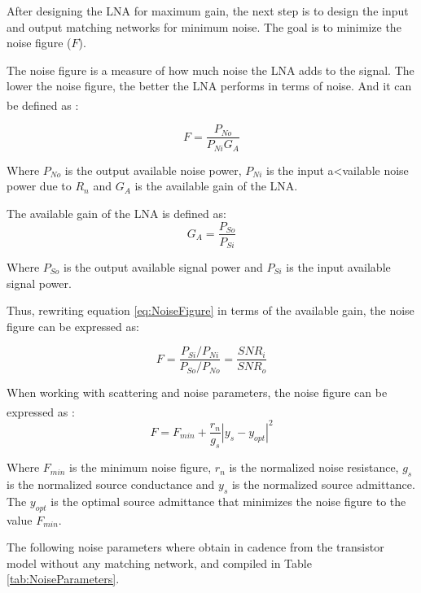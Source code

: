 After designing the LNA for maximum gain, the next step is to design the input and output matching networks for minimum noise. The goal is to minimize the noise figure ($F$). 

The noise figure is a measure of how much noise the LNA adds to the signal. The lower the noise figure, the better the LNA performs in terms of noise. And it can be defined as \textsuperscript{\cite{Gillermo-Gonzalez}}:

\begin{equation}
    F = \frac{P_{No}}{P_{Ni}G_A}
    \label{eq:NoiseFigure}
\end{equation}

Where $P_{No}$ is the output available noise power, $P_{Ni}$ is the input a<vailable noise power due to $R_n$ and $G_A$ is the available gain of the LNA.

The available gain of the LNA is defined as:
\begin{equation}
    G_A = \frac{P_{So}}{P_{Si}}
    \label{eq:AvailableGain}
\end{equation}

Where $P_{So}$ is the output available signal power and $P_{Si}$ is the input available signal power.

Thus, rewriting equation \ref{eq:NoiseFigure} in terms of the available gain, the noise figure can be expressed as:

\begin{equation}
    F = \frac{P_{Si}/P_{Ni}}{P_{So}/P_{No}} = \frac{SNR_i}{SNR_o}
    \label{eq:NoiseFigure2}
\end{equation}

When working with scattering and noise parameters, the noise figure can be expressed as \textsuperscript{\cite{Gillermo-Gonzalez}}:
\begin{equation}
    F = F_{min} + \frac{r_n}{g_s}|y_s -y_{opt}|^2
    \label{eq:NoiseFigure3}
\end{equation}

Where $F_{min}$ is the minimum noise figure, $r_n$ is the normalized noise resistance, $g_s$ is the normalized source conductance and $y_s$ is the normalized source admittance. The $y_{opt}$ is the optimal source admittance that minimizes the noise figure to the value $F_{min}$.

The following noise parameters where obtain in cadence from the transistor model without any matching network, and compiled in Table \ref{tab:NoiseParameters}.

